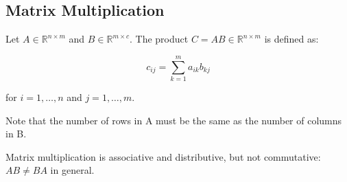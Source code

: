 
\subsection{Matrix Multiplication}

Let \( A \in \mathbb{R}^{n \times m} \) and \( B \in \mathbb{R}^{m \times c} \). The product \( C = AB \in \mathbb{R}^{n \times m} \) is defined as:

\begin{equation}
  c_{ij} = \sum_{k=1}^{m} a_{ik} b_{kj}
\end{equation}


for \( i = 1, \ldots, n \) and \( j = 1, \ldots, m \).

Note that the number of rows in A must be the same as the number of columns in B.

Matrix multiplication is associative and distributive, but not commutative: \( AB \neq BA \) in general.
